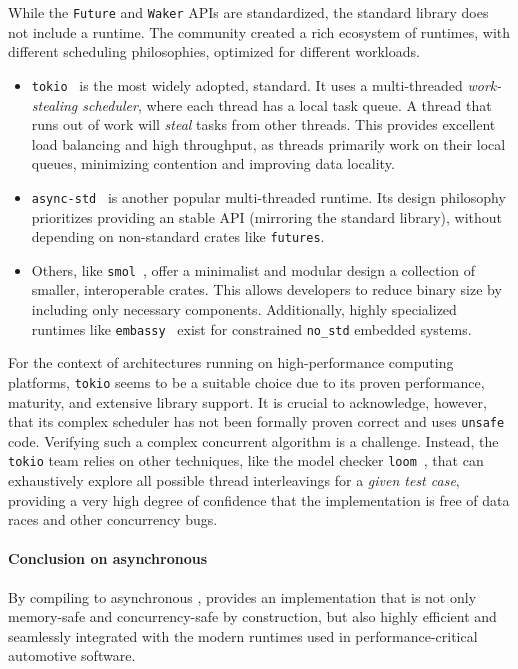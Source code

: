 While the \texttt{Future} and \texttt{Waker} APIs are standardized, the \Rust standard library
does not include a runtime. The \Rust community created a rich ecosystem of runtimes, with different
scheduling philosophies, optimized for different workloads.
\begin{itemize}
    \item \texttt{tokio}~\cite{tokio} is the most widely adopted,  standard. It uses a
          multi-threaded \emph{work-stealing scheduler}, where each thread has a local task queue. A
          thread that runs out of work will \emph{steal} tasks from other threads. This provides
          excellent load balancing and high throughput, as threads primarily work on their local
          queues, minimizing contention and improving data locality.

    \item \texttt{async-std}~\cite{async_std} is another popular multi-threaded runtime. Its design
          philosophy prioritizes providing an stable API (mirroring the standard library), without
          depending on non-standard crates like \texttt{futures}.

    \item Others, like \texttt{smol}~\cite{smol}, offer a minimalist and modular design \via a
          collection of smaller, interoperable crates. This allows developers to reduce binary size
          by including only necessary components. Additionally, highly specialized runtimes like
          \texttt{embassy}~\cite{embassy} exist for constrained \texttt{no\_std} embedded systems.
\end{itemize}

For the context of \sdv architectures running on high-performance computing platforms,
\texttt{tokio} seems to be a suitable choice due to its proven performance, maturity, and extensive
library support. It is crucial to acknowledge, however, that its complex scheduler has not been
formally proven correct and uses \texttt{unsafe} code. Verifying such a complex concurrent algorithm
is a challenge. Instead, the \texttt{tokio} team relies on other techniques, like the model checker
\texttt{loom}~\cite{loom}, that can exhaustively explore all possible thread interleavings for a
\emph{given test case}, providing a very high degree of confidence that the implementation is free
of data races and other concurrency bugs.

\paragraph{Conclusion on asynchronous \Rust}
By compiling to asynchronous \Rust, \GRust provides an implementation that is not only memory-safe
and concurrency-safe by construction, but also highly efficient and seamlessly integrated with the
modern runtimes used in performance-critical automotive software.

